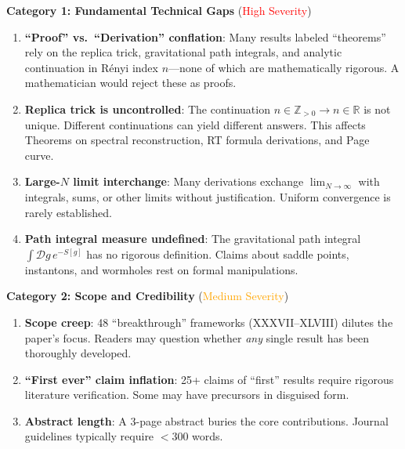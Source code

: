 \documentclass[12pt,a4paper]{article}
\begin{document}
\begin{tcolorbox}[colback=red!5!white, colframe=red!75!black, title=\textbf{RED TEAM: Critical Issues (Severity-Ranked)}]

\textbf{Category 1: Fundamental Technical Gaps} (\textcolor{red}{High Severity})
\begin{enumerate}[label=\textbf{R\arabic*.}]
    \item \textbf{``Proof'' vs.\ ``Derivation'' conflation}: Many results labeled ``theorems'' rely on the replica trick, gravitational path integrals, and analytic continuation in R\'enyi index $n$---none of which are mathematically rigorous. A mathematician would reject these as proofs.
    
    \item \textbf{Replica trick is uncontrolled}: The continuation $n \in \mathbb{Z}_{>0} \to n \in \mathbb{R}$ is not unique. Different continuations can yield different answers. This affects Theorems on spectral reconstruction, RT formula derivations, and Page curve.
    
    \item \textbf{Large-$N$ limit interchange}: Many derivations exchange $\lim_{N\to\infty}$ with integrals, sums, or other limits without justification. Uniform convergence is rarely established.
    
    \item \textbf{Path integral measure undefined}: The gravitational path integral $\int \mathcal{D}g\, e^{-S[g]}$ has no rigorous definition. Claims about saddle points, instantons, and wormholes rest on formal manipulations.
\end{enumerate}

\textbf{Category 2: Scope and Credibility} (\textcolor{orange}{Medium Severity})
\begin{enumerate}[resume, label=\textbf{R\arabic*.}]
    \item \textbf{Scope creep}: 48 ``breakthrough'' frameworks (XXXVII--XLVIII) dilutes the paper's focus. Readers may question whether \emph{any} single result has been thoroughly developed.
    
    \item \textbf{``First ever'' claim inflation}: 25+ claims of ``first'' results require rigorous literature verification. Some may have precursors in disguised form.
    
    \item \textbf{Abstract length}: A 3-page abstract buries the core contributions. Journal guidelines typically require $<$300 words.
    

\end{enumerate}
\end{tcolorbox}
\end{document}
